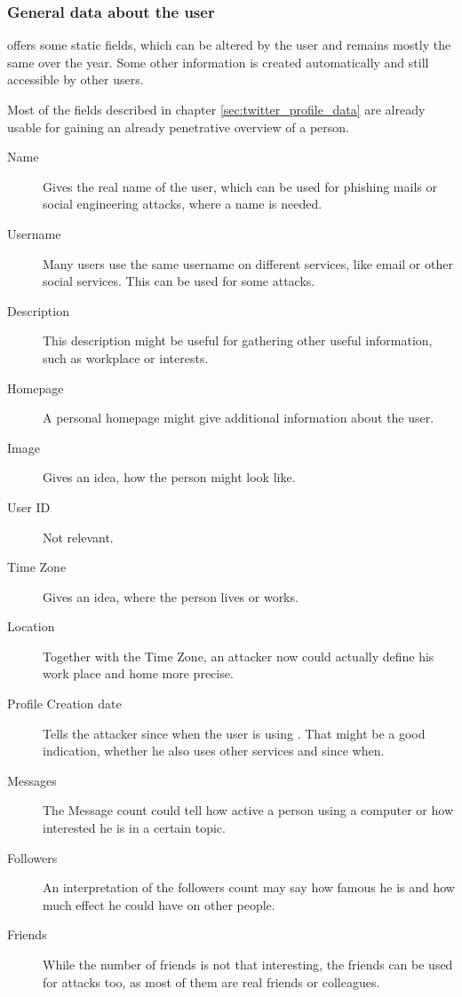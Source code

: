 \subsubsection{General data about the user}
\Twitter{} offers some static fields, which can be altered by the user and
remains mostly the same over the year. Some other information is created
automatically and still accessible by other users.

Most of the fields described in chapter \ref{sec:twitter_profile_data} are
already usable for gaining an already penetrative overview of a person.

\begin{description}
\item[Name] Gives the real name of the user, which can be used for
phishing mails or social engineering attacks, where a name is needed.

\item[Username] Many users use the same username on different
services, like email or other social services. This can be used for some
attacks.

\item[Description] This description might be useful for gathering other useful
information, such as workplace or interests.

\item[Homepage] A personal homepage might give additional
information about the user.

\item[Image] Gives an idea, how the person might
look like.

\item[User ID] Not relevant.

\item[Time Zone] Gives an idea, where the person
lives or works.

\item[Location] Together with the Time Zone, an attacker now
could actually define his work place and home more precise.

\item[Profile Creation date] Tells the attacker
since when the user is using \Twitter{}. That might be a good indication,
whether he also uses other services and since when.

\item[Messages] The Message count could tell how active a person using a
computer or how interested he is in a certain topic.

\item[Followers] An interpretation of the followers count may say how
famous he is and how much effect he could have on other people.

\item[Friends] While the number of friends is not that interesting,
the friends can be used for attacks too, as most of them are real friends
or colleagues.
\end{description}

